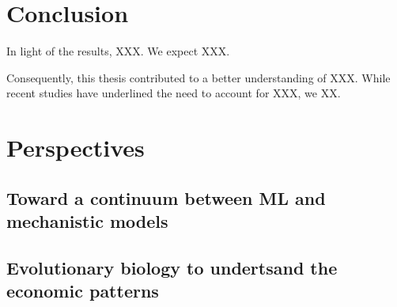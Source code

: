 \section{Conclusion}
In light of the results, XXX.
% 
We expect XXX.

Consequently, this thesis contributed to a better understanding of XXX.
% 
While recent studies have underlined the need to account for XXX, we XX.

\section{Perspectives}

\subsection{Toward a continuum between ML and mechanistic models}

\subsection{Evolutionary biology to undertsand the economic patterns}


